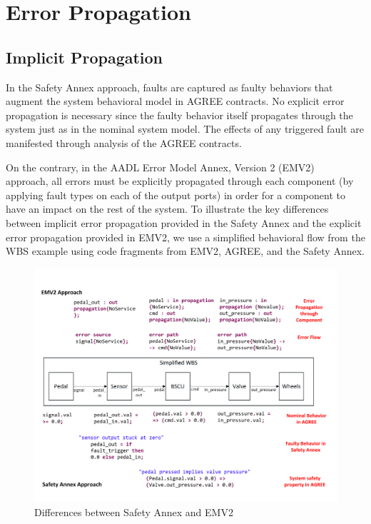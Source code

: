 \section{Error Propagation}

\subsection{Implicit Propagation}
In the Safety Annex approach, faults are captured as faulty behaviors that augment the system behavioral model in AGREE contracts. No explicit %
error propagation is necessary since the faulty behavior itself propagates through the system just as in the nominal system model. The effects of any triggered fault are manifested through analysis of the AGREE contracts. 

On the contrary, in the AADL Error Model Annex, Version 2 (EMV2)~\cite{EMV2} approach, all errors must be explicitly propagated through each component (by applying fault types on each of the output ports) in order for a component to have an impact on the rest of the system. To illustrate the key differences between implicit %
error propagation provided in the Safety Annex and the explicit %
error propagation provided in EMV2, we use a simplified behavioral flow from the WBS example using code fragments from EMV2, AGREE, and the Safety Annex. 

\begin{figure}[t]
	\hspace*{-2cm}
	\vspace{-0.19in}
	\centering
	\includegraphics[trim=0 9 0 5,clip,width=\textwidth]{images/Comparison_with_EMV2.pdf}
	\caption{Differences between Safety Annex and EMV2}
	\label{fig:comparison_with_EMV2}
\end{figure} 

